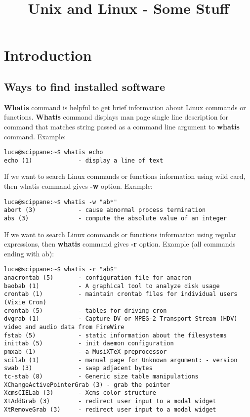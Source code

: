 \documentclass[10pt,letterpaper]{book}
\begin{document}
\title{Unix and Linux - Some Stuff}
\tableofcontents
\chapter{Introduction}
\section{Ways to find installed software}
\textbf{Whatis} command is helpful to get brief information about Linux commands or functions. \textbf{Whatis} command displays man page single line description for command that matches string passed as a command line argument to \textbf{whatis} command. Example:
\begin{lstlisting}
luca@scippane:~$ whatis echo
echo (1)             - display a line of text
\end{lstlisting}
If we want to search Linux commands or functions information using wild card, then whatis command gives \textbf{-w} option. Example:
\begin{lstlisting}
luca@scippane:~$ whatis -w "ab*"
abort (3)            - cause abnormal process termination
abs (3)              - compute the absolute value of an integer
\end{lstlisting}
If we want to search Linux commands or functions information using regular expressions, then \textbf{whatis} command gives \textbf{-r} option. Example (all commands ending with ab):
\begin{lstlisting}
luca@scippane:~$ whatis -r "ab$"
anacrontab (5)       - configuration file for anacron
baobab (1)           - A graphical tool to analyze disk usage
crontab (1)          - maintain crontab files for individual users (Vixie Cron)
crontab (5)          - tables for driving cron
dvgrab (1)           - Capture DV or MPEG-2 Transport Stream (HDV) video and audio data from FireWire
fstab (5)            - static information about the filesystems
inittab (5)          - init daemon configuration
pmxab (1)            - a MusiXTeX preprocessor
scilab (1)           - manual page for Unknown argument: - version
swab (3)             - swap adjacent bytes
tc-stab (8)          - Generic size table manipulations
XChangeActivePointerGrab (3) - grab the pointer
XcmsCIELab (3)       - Xcms color structure
XtAddGrab (3)        - redirect user input to a modal widget
XtRemoveGrab (3)     - redirect user input to a modal widget
\end{lstlisting}
\end{document}
